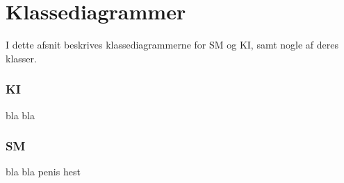\chapter{Klassediagrammer}
I dette afsnit beskrives klassediagrammerne for SM og KI, samt nogle af deres klasser.
\subsection{KI}
bla bla
\subsection{SM}
bla bla penis hest
